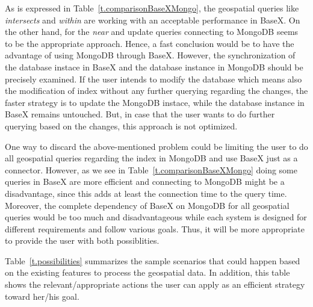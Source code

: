 \documentclass[a4paper,12pt]{article}
\begin{document}
As is expressed in Table~\ref{t.comparisonBaseXMongo}, the geospatial queries like \textit{intersects} and \textit{within} are working with an acceptable performance in BaseX. On the other hand, for the \textit{near} and update queries connecting to MongoDB seems to be the appropriate approach. Hence, a fast conclusion would be to have the advantage of using MongoDB through BaseX. However, the synchronization of the database instace in BaseX and the database instance in MongoDB should be precisely examined. If the user intends to modify the database which means also the modification of index without any further querying regarding the changes, the faster strategy is to update the MongoDB instace, while the database instance in BaseX remains untouched. But, in case that the user wants to do further querying based on the changes, this approach is not optimized.  

One way to discard the above-mentioned problem could be limiting the user to do all geospatial queries regarding the index in MongoDB and use BaseX just as a connector. 
However, as we see in Table~\ref{t.comparisonBaseXMongo} doing some queries in BaseX are more efficient and connecting to MongoDB might be a disadvantage, since this adds at least the connection time to the query time. Moreover, the complete dependency of BaseX on MongoDB for all geospatial queries would be too much and disadvantageous while each system is designed for different requirements and follow various goals. 
Thus, it will be more appropriate to provide the user with both possiblities.

Table~\ref{t.possibilities} summarizes the sample scenarios that could happen based on the existing features to process the geospatial data. In addition, this table shows the relevant/appropriate actions the user can apply as an efficient strategy toward her/his goal.


\begin{table}
\centering
{}
\caption{Possible scenarios and appropriate actions suggested to take}
\label{t.possibilities}
\end{table}
\end{document}
